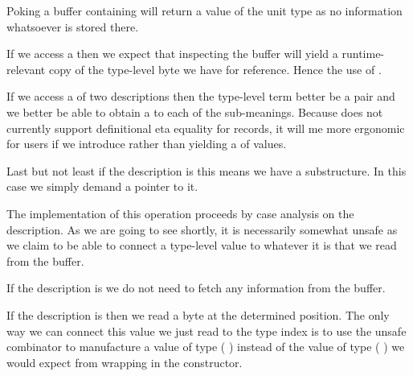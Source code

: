 
Poking a buffer containing  will return a value of
the unit type as no information whatsoever is stored there.

If we access a  then we expect that inspecting the
buffer will yield a runtime-relevant copy of the type-level byte we
have for reference. Hence the use of .

If we access a  of two descriptions then the type-level term
better be a pair and we better be able to obtain a 
to each of the sub-meanings.
%
Because \idris{} does not currently support definitional eta equality
for records, it will me more ergonomic for users if we introduce
 rather than yielding a  of values.

Last but not least if the description is  this means
we have a substructure. In this case we simply demand a pointer to it.


The implementation of this operation proceeds by case analysis
on the description.
%
As we are going to see shortly, it is necessarily somewhat unsafe
as we claim to be able to connect a type-level value to whatever
it is that we read from the buffer.


If the description is  we do not need to fetch any
information from the buffer.


If the description is  then we read a byte at the
determined position. The only way we can connect this value we just
read to the type index is to use the unsafe combinator
 to manufacture a value of type
( ) instead of the value of type
( )
we would expect from wrapping  in the  constructor.



